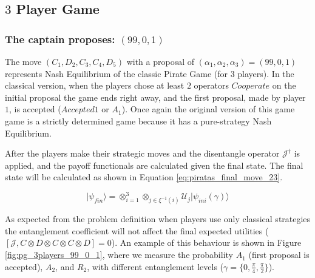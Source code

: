 \subsection{$3$ Player Game}
\label{subsec:3playergame}


\subsubsection{The captain proposes: $(99, 0, 1)$}
\label{subsubsec:3playergame99}

The move $(C_1,D_2,C_3,C_4,D_5)$ with a proposal of $(\alpha_{1}, \alpha_{2}, \alpha_{3}) =(99, 0, 1)$ represents Nash Equilibrium of the classic Pirate Game (for $3$ players). In the classical version, when the players chose at least $2$ operators $Cooperate$ on the initial proposal the game ends right away, and the first proposal, made by player $1$, is accepted ($Accepted 1$ or $A_{1}$). Once again the original version of this game game is a strictly determined game because it has a pure-strategy Nash Equilibrium.

After the players make their strategic moves and the disentangle operator $\mathcal{J}^{\dagger}$ is applied, and the payoff functionals are calculated given the final state. The final state will be calculated as shown in Equation \ref{eq:piratas_final_move_23}.

\begin{equation}
\vert\psi_{fin}\rangle=\otimes_{i=1}^{3}\otimes_{j\in\xi^{-1}(i)}\mathcal{U}_{j}\vert\psi_{ini}(\gamma)\rangle
\label{eq:piratas_final_move_23}
\end{equation} 

As expected from the problem definition when players use only classical strategies the entanglement coefficient will not affect the final expected utilities ($[ \mathcal{J} , C \otimes D \otimes C \otimes C \otimes D ] = 0 $).
An example of this behaviour is shown in Figure \ref{fig:pg_3players_99_0_1}, where we measure the probability $A_{1}$ (first proposal is accepted), $A_{2}$, and $R_{2}$, with different entanglement levels ($\gamma= \{ 0 , \frac{ \pi}{4}, \frac{\pi}{2} \} $).


